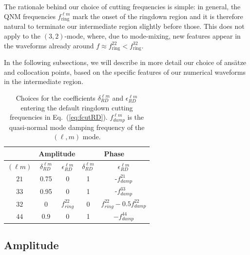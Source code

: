 \documentclass[twocolumn,prd,aps,superscriptaddress,preprintnumbers,tightenlines,showpacs,nofootinbib,eqsecnum,amsfonts,amsmath]{revtex4}
\begin{document}
The rationale behind our choice of cutting frequencies is simple: in general, the QNM frequencies $f_{\mathrm{ring}}^{\ell m}$ mark the onset of the ringdown region and it is therefore natural to terminate our intermediate region slightly before those. This does not apply to the $(3,2)$-mode, where, due to mode-mixing, new features appear in the waveforms already around $f\approx f_{\mathrm{ring}}^{22}<f_{\mathrm{ring}}^{32}$.

In the following subsections, we will describe in more detail our choice of ansätze and collocation points, based on the specific features of our numerical waveforms in the intermediate region. 
 
\begin{table}[h!]
\caption{Choices for the coefficients $\delta^{\ell m}_{RD}$ and $\epsilon^{\ell m}_{RD}$ entering the default ringdown cutting frequencies in Eq.~(\ref{eq:fcutRD}). $f^{\ell m}_{damp}$ is the quasi-normal mode damping frequency of the $(\ell,m)$ mode.}
\label{tab:fcutRD}
\begin{center}
{\renewcommand{\arraystretch}{1.5}
\begin{tabular}{| c || c | c | c | c |}
\hline
 &\multicolumn{2}{c|}{Amplitude} & \multicolumn{2}{c|}{Phase}\\
\hline
$(\ell m)$      & $\delta_{RD}^{\ell m} $    & $\epsilon_{RD}^{\ell m}$   & $\delta_{RD}^{\ell m} $    & $\epsilon_{RD}^{\ell m}$    \\  
\hline                        
$21$     & 0.75  & 0 & 1 & -$f_{damp}^{21}$ \\
\hline
$33$ & 0.95 & 0 & 1 & -$f_{damp}^{33}$ \\
\hline
$32$ &  0 & $f_{ring}^{22}$ & 0 & $f_{ring}^{22}-0.5 f_{damp}^{22}$\\
\hline
$44$ & 0.9 & 0 & 1 & $-f_{damp}^{44}$\\
\hline
\end{tabular}
}
\end{center}
\end{table}


\subsection{Amplitude}
\label{subsec:amp_intermediate}
\end{document}
